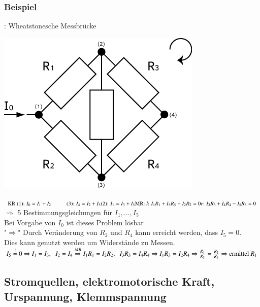\documentclass[11pt]{article}
\begin{document}
	\subsubsection{Beispiel} : Wheatstonesche Messbrücke
	\begin{center}
		\includegraphics[width=0.5\linewidth]{skizzen/15/15_4-6/15_5B4}
	\end{center}
	\begin{math}
		\text{KR:} \\
		\text{(1): } I_0 = I_1 + I_2 \hspace{1cm} \text{(3): } I_4 = I_2 + I_5\\
		\text{(2): } I_1 = I_3 + I_5 \\
		\hfill \\
		\text{MR: } \\
		\text{\emph{l}: } I_1R_1+I_5R_5-I_2R_2=0 \\
		\text{\emph{r}: } I_3R_3+I_4R_4-I_5R_5=0 
	\end{math}
	$ \Rightarrow $ 5 Bestimmungsgleichungen für $ I_1,...,I_5 $ \\
	Bei Vorgabe von $ I_0 $ ist dieses Problem lösbar \\
	"$ \Rightarrow $" Durch Veränderung von $ R_2 $ und $ R_4 $ kann erreicht werden, dass $ I_5=0 $.\\
	Dies kann genutzt werden um Widerstände zu Messen.\\
	\begin{math}
		I_5 \overset{!}{=} 0 \Rightarrow I_1 = I_3,\hspace{2mm} I_2 = I_4 \\
		\overset{MR}{\Rightarrow} I_1 R_1 = I_2 R_2,\hspace{2mm} I_3 R_3 = I_4 R_4 \Rightarrow I_1 R_3 = I_2 R_4 \\
		\Rightarrow \frac{R_1}{R_3} = \frac{R_2}{R_4} \Rightarrow \text{ermittel } R_1
	\end{math}

	
	\subsection{Stromquellen, elektromotorische Kraft, Urspannung, Klemmspannung}
				
\end{document}

